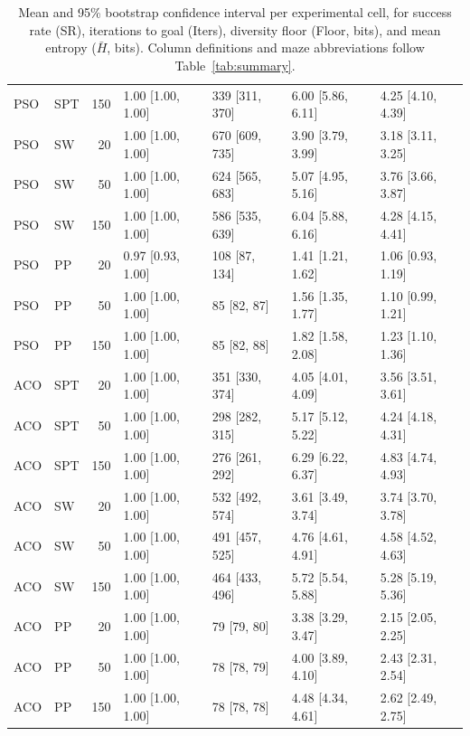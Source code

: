 \documentclass[11pt,a4paper]{article}
\begin{document}
\begin{table}[ht]
\begin{tabular}{llrllll}
            PSO & SPT & 150 & 1.00 [1.00, 1.00] & 339 [311, 370] & 6.00 [5.86, 6.11] & 4.25 [4.10, 4.39] \\
            PSO & SW & 20 & 1.00 [1.00, 1.00] & 670 [609, 735] & 3.90 [3.79, 3.99] & 3.18 [3.11, 3.25] \\
            PSO & SW & 50 & 1.00 [1.00, 1.00] & 624 [565, 683] & 5.07 [4.95, 5.16] & 3.76 [3.66, 3.87] \\
            PSO & SW & 150 & 1.00 [1.00, 1.00] & 586 [535, 639] & 6.04 [5.88, 6.16] & 4.28 [4.15, 4.41] \\
            PSO & PP & 20 & 0.97 [0.93, 1.00] & 108 [87, 134] & 1.41 [1.21, 1.62] & 1.06 [0.93, 1.19] \\
            PSO & PP & 50 & 1.00 [1.00, 1.00] & 85 [82, 87] & 1.56 [1.35, 1.77] & 1.10 [0.99, 1.21] \\
            PSO & PP & 150 & 1.00 [1.00, 1.00] & 85 [82, 88] & 1.82 [1.58, 2.08] & 1.23 [1.10, 1.36] \\
            \midrule
            ACO & SPT & 20 & 1.00 [1.00, 1.00] & 351 [330, 374] & 4.05 [4.01, 4.09] & 3.56 [3.51, 3.61] \\
            ACO & SPT & 50 & 1.00 [1.00, 1.00] & 298 [282, 315] & 5.17 [5.12, 5.22] & 4.24 [4.18, 4.31] \\
            ACO & SPT & 150 & 1.00 [1.00, 1.00] & 276 [261, 292] & 6.29 [6.22, 6.37] & 4.83 [4.74, 4.93] \\
            ACO & SW & 20 & 1.00 [1.00, 1.00] & 532 [492, 574] & 3.61 [3.49, 3.74] & 3.74 [3.70, 3.78] \\
            ACO & SW & 50 & 1.00 [1.00, 1.00] & 491 [457, 525] & 4.76 [4.61, 4.91] & 4.58 [4.52, 4.63] \\
            ACO & SW & 150 & 1.00 [1.00, 1.00] & 464 [433, 496] & 5.72 [5.54, 5.88] & 5.28 [5.19, 5.36] \\
            ACO & PP & 20 & 1.00 [1.00, 1.00] & 79 [79, 80] & 3.38 [3.29, 3.47] & 2.15 [2.05, 2.25] \\
            ACO & PP & 50 & 1.00 [1.00, 1.00] & 78 [78, 79] & 4.00 [3.89, 4.10] & 2.43 [2.31, 2.54] \\
            ACO & PP & 150 & 1.00 [1.00, 1.00] & 78 [78, 78] & 4.48 [4.34, 4.61] & 2.62 [2.49, 2.75] \\
            \bottomrule
        \end{tabular}
        \caption{Mean and 95\% bootstrap confidence interval per experimental cell, for success rate (SR), iterations to goal (Iters), diversity floor (Floor, bits), and mean entropy ($\bar{H}$, bits). Column definitions and maze abbreviations follow Table~\ref{tab:summary}.}
        \label{tab:cis}
    \end{table}
\end{document}
